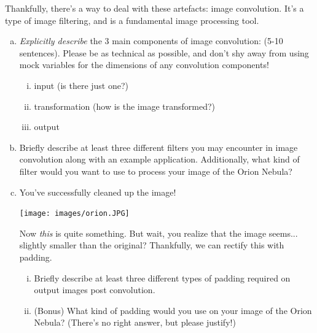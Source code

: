 Thankfully, there's a way to deal with these artefacts: image convolution. It's a type of image filtering, and is a fundamental image processing tool.

\begin{enumerate}[(a)]
\item \emph{Explicitly describe} the 3 main components of image convolution: (5-10 sentences). Please be as technical as possible, and don't shy away from using mock variables for the dimensions of any convolution components!
\begin{enumerate}[(i)]
    \item input (is there just one?)
    
    
    \item transformation (how is the image transformed?)
    
    
    \item output
    
    
\end{enumerate}

\item Briefly describe at least three different filters you may encounter in image convolution along with an example application. Additionally, what kind of filter would you want to use to process your image of the Orion Nebula? 


\item
You've successfully cleaned up the image!

\texttt{[image: images/orion.JPG]}

Now \textit{this} is quite something. But wait, you realize that the image seems... slightly smaller than the original? Thankfully, we can rectify this with padding.
\begin{enumerate}[(i)]
    \item Briefly describe at least three different types of padding required on output images post convolution. 


    \item (Bonus) What kind of padding would you use on your image of the Orion Nebula? (There's no right answer, but please justify!)
    
\end{enumerate}

\end{enumerate}


